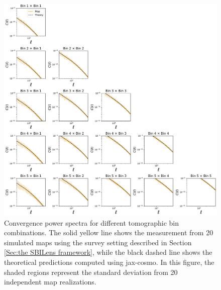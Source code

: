 \documentclass{aa}
\begin{document}
\begin{figure}
    \centering
    \includegraphics[width=\textwidth]{figures/psconvergencemaps.pdf}
    \caption{
    Convergence power spectra for different tomographic bin combinations. The solid yellow line shows the measurement from 20 simulated maps using the survey setting described in Section \ref{Sec:the SBILens framework}, while the black dashed line shows the theoretical predictions computed using jax-cosmo. In this figure, the shaded regions represent the standard deviation from 20 independent map realizations.
    }
     \label{fig:psconvergence_maps}
\end{figure}
\end{document}

